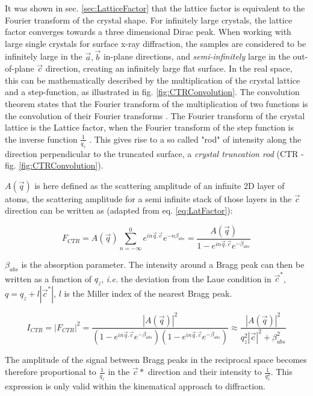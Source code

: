 It was shown in sec. \ref{sec:LatticeFactor} that the lattice factor is equivalent to the Fourier transform of the crystal shape.
For infinitely large crystals, the lattice factor converges towards a three dimensional Dirac peak.
When working with large single crystals for surface x-ray diffraction, the samples are considered to be infinitely large in the $\vec{a}, \vec{b}$ in-plane directions, and \textit{semi-infinitely} large in the out-of-plane $\vec{c}$ direction, creating an infinitely large flat surface.
In the real space, this can be mathematically described by the multiplication of the crystal lattice and a step-function, as illustrated in fig. \ref{fig:CTRConvolution}.
The convolution theorem states that the Fourier transform of the multiplication of two functions is the convolution of their Fourier transforms \parencite{Mcalister2003}.
The Fourier transform of the crystal lattice is the Lattice factor, when the Fourier transform of the step function is the inverse function $\frac{1}{q_z}$ \parencite{Andrews1985, Robinson1986}.
This gives rise to a so called "rod" of intensity along the direction perpendicular to the truncated surface, a \textit{crystal truncation rod} (CTR - fig. \ref{fig:CTRConvolution}).

$A(\vec{q})$ is here defined as the scattering amplitude of an infinite 2D layer of atoms, the scattering amplitude for a semi infinite stack of those layers in the $\vec{c}$ direction can be written as (adapted from eq. \ref{eq:LatFactor}):

\begin{equation}
    \label{eq:CTR1}
    F_{CTR} = A(\vec{q})\sum_{n=-\infty}^0 e^{in\vec{q}.\vec{c}} e^{-n\beta_{abs}} = \frac{A(\vec{q})}{1 - e^{in\vec{q}.\vec{c}} e^{-\beta_{abs}}}
\end{equation}

$\beta_{abs}$ is the absorption parameter.
The intensity around a Bragg peak can then be written as a function of $q_z$, \textit{i.e.} the deviation from the Laue condition in $\vec{c}^*$, $q = q_z + l|\vec{c}^*|$, $l$ is the Miller index of the nearest Bragg peak.

\begin{equation}
    \label{eq:CTR2}
    I_{CTR} = |F_{CTR}|^2 = \frac{|A(\vec{q})|^2}{(1 - e^{in\vec{q}.\vec{c}} e^{-\beta_{abs}})(1 - e^{in\vec{q}.\vec{c}} e^{-\beta_{abs}})} \approx \frac{|A(\vec{q})|^2}{q_z^2 |\vec{c}|^2 + \beta_{abs}^2 }
\end{equation}

The amplitude of the signal between Bragg peaks in the reciprocal space becomes therefore proportional to $\frac{1}{q_z}$ in the $\vec{c}*$ direction and their intensity to $\frac{1}{q_z^2}$.
This expression is only valid within the kinematical approach to diffraction.

